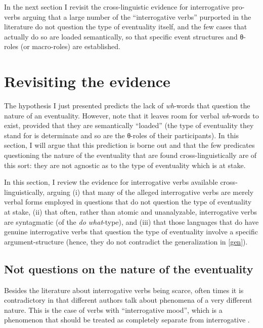 \documentclass[output=paper]{langsci/langscibook}
\begin{document}
In the next section I revisit the cross-linguistic evidence for interrogative
pro-verbs arguing that a large number of the ``interrogative verbs'' purported in the literature do not question the type of eventuality itself, and the few cases that actually do so are loaded semantically, so that specific event structures and θ-roles (or macro-roles) are established.

\section{Revisiting the evidence}
\label{sec:revisiting}

The hypothesis I just presented predicts the lack of \emph{wh}-words that
question the nature of an eventuality. However, note that it leaves room for
verbal \emph{wh}-words to exist, provided that they are semantically ``loaded''
(the type of eventuality they stand for is determinate and so are the θ-roles
of their participants). In this section, I will argue that this prediction is
borne out and that the few predicates questioning the nature of the eventuality
that are found cross-linguistically are of this sort: they are not agnostic as
to the type of eventuality which is at stake.

In this section, I review the evidence for interrogative verbs available
cross-linguistically, arguing (i) that many of the alleged interrogative verbs
are merely verbal forms employed in questions that do not question the type of
eventuality at stake, (ii) that often, rather than atomic and unanalyzable,
interrogative verbs are syntagmatic (of the \emph{do what}-type), and (iii)
that those languages that do have genuine interrogative verbs that question the
type of eventuality involve a specific argument-structure (hence, they do not
contradict the generalization in \ref{gen}).

\subsection{Not questions on the nature of the eventuality}
\label{notquestions}

Besides the literature about interrogative verbs being scarce, often times it
is contradictory in that different authors talk about phenomena of a very
different nature. This is the case of verbs with ``interrogative mood'', which is a phenomenon that should be treated as completely  separate from interrogative .
\end{document}
